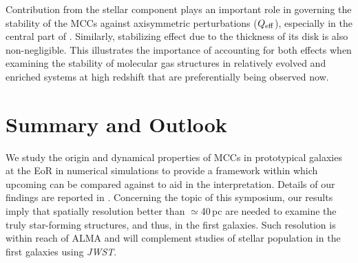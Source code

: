 \documentclass{iau}
\begin{document}
Contribution from the stellar component plays an important role in governing the stability of the MCCs against axisymmetric perturbations 
($Q_{\rm eff}$), especially in the central part of \flower. Similarly, stabilizing effect due to the thickness of its disk is also non-negligible. This illustrates the importance of accounting for both effects when examining the stability of molecular gas structures in relatively evolved and enriched systems at high redshift that are preferentially being observed now.
%



\vspace{-1.2em}
\section{Summary and Outlook}

We study the origin and dynamical properties of MCCs in prototypical galaxies at the EoR in numerical simulations to provide a framework within which upcoming \obs can be compared against to aid in the interpretation. 
Details of our findings are reported in \citet{Leung19c}. 
Concerning the topic of this symposium, our results imply that spatially resolution better than $\simeq$40\,pc are needed to examine 
the truly star-forming structures, and thus, \SF in the first galaxies. Such resolution is within reach of ALMA and 
will complement studies of stellar population in the first galaxies using {\it JWST}.
\end{document}

